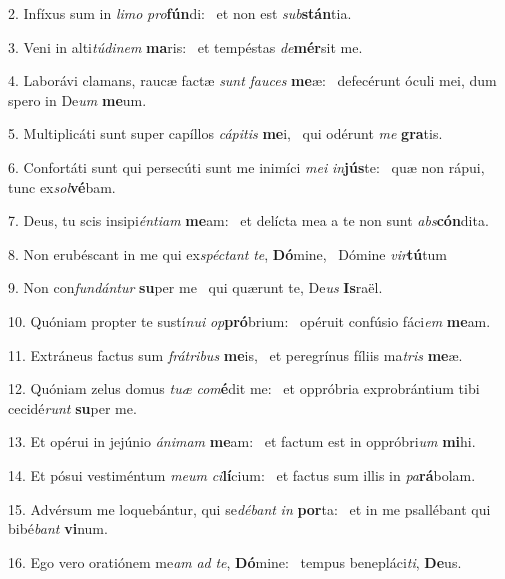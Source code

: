 2. Infíxus sum in \textit{li}\textit{mo} \textit{pro}\textbf{fún}di: \ast\  et non est \textit{sub}\textbf{stán}tia.\

3. Veni in alti\textit{tú}\textit{di}\textit{nem} \textbf{ma}ris: \ast\  et tempéstas \textit{de}\textbf{mér}sit me.\

4. Laborávi clamans, raucæ factæ \textit{sunt} \textit{fau}\textit{ces} \textbf{me}æ: \ast\  defecérunt óculi mei, dum spero in De\textit{um} \textbf{me}um.\

5. Multiplicáti sunt super capíllos \textit{cá}\textit{pi}\textit{tis} \textbf{me}i, \ast\  qui odérunt \textit{me} \textbf{gra}tis.\

6. Confortáti sunt qui persecúti sunt me inimíci \textit{me}\textit{i} \textit{in}\textbf{jús}te: \ast\  quæ non rápui, tunc ex\textit{sol}\textbf{vé}bam.\

7. Deus, tu scis insipi\textit{én}\textit{ti}\textit{am} \textbf{me}am: \ast\  et delícta mea a te non sunt \textit{abs}\textbf{cón}dita.\

8. Non erubéscant in me qui ex\textit{spéc}\textit{tant} \textit{te}, \textbf{Dó}mine, \ast\  Dómine \textit{vir}\textbf{tú}tum\

9. Non con\textit{fun}\textit{dán}\textit{tur} \textbf{su}per me \ast\  qui quærunt te, De\textit{us} \textbf{Is}raël.\

10. Quóniam propter te sustí\textit{nu}\textit{i} \textit{op}\textbf{pró}brium: \ast\  opéruit confúsio fáci\textit{em} \textbf{me}am.\

11. Extráneus factus sum \textit{frá}\textit{tri}\textit{bus} \textbf{me}is, \ast\  et peregrínus fíliis ma\textit{tris} \textbf{me}æ.\

12. Quóniam zelus domus \textit{tu}\textit{æ} \textit{com}\textbf{é}dit me: \ast\  et oppróbria exprobrántium tibi cecidé\textit{runt} \textbf{su}per me.\

13. Et opérui in jejúnio \textit{á}\textit{ni}\textit{mam} \textbf{me}am: \ast\  et factum est in oppróbri\textit{um} \textbf{mi}hi.\

14. Et pósui vestiméntum \textit{me}\textit{um} \textit{ci}\textbf{lí}cium: \ast\  et factus sum illis in \textit{pa}\textbf{rá}bolam.\

15. Advérsum me loquebántur, qui se\textit{dé}\textit{bant} \textit{in} \textbf{por}ta: \ast\  et in me psallébant qui bibé\textit{bant} \textbf{vi}num.\

16. Ego vero oratiónem me\textit{am} \textit{ad} \textit{te}, \textbf{Dó}mine: \ast\  tempus benepláci\textit{ti}, \textbf{De}us.\

